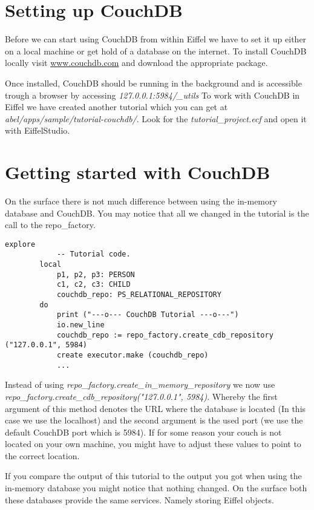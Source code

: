 \documentclass[a4paper,12pt]{report}
\begin{document}
\section{Setting up CouchDB}

Before we can start using CouchDB from within Eiffel we have to set it up either on a local machine or get hold of a database on the internet. To install CouchDB locally visit \url{www.couchdb.com} and download the appropriate package.

Once installed, CouchDB should be running in the background and is accessible trough a browser by accessing \emph{127.0.0.1:5984/\_utils}
To work with CouchDB in Eiffel we have created another tutorial which you can get at \emph{abel/apps/sample/tutorial-couchdb/}. Look for the \emph{tutorial\_project.ecf} and open it with EiffelStudio.

\section{Getting started with CouchDB}

On the surface there is not much difference between using the in-memory database and CouchDB. You may notice that all we changed in the tutorial is the call to the repo\_factory. 
\begin{lstlisting}[language=OOSC2Eiffel, captionpos=b, caption={The CouchDB Tutorial}, label={lst:explore_couchdb}]
	explore
			-- Tutorial code.
		local
			p1, p2, p3: PERSON
			c1, c2, c3: CHILD
			couchdb_repo: PS_RELATIONAL_REPOSITORY
		do
			print ("---o--- CouchDB Tutorial ---o---")
			io.new_line
			couchdb_repo := repo_factory.create_cdb_repository ("127.0.0.1", 5984)
			create executor.make (couchdb_repo)
			...
\end{lstlisting}
Instead of using \emph{repo\_factory.create\_in\_memory\_repository} we now use \newline
\emph{repo\_factory.create\_cdb\_repository("127.0.0.1", 5984)}.
Whereby the first argument of this method denotes the URL where the database is located (In this case we use the localhost) and the second argument is the used port (we use the default CouchDB port which is 5984). If for some reason your couch is not located on your own machine, you might have to adjust these values to point to the correct location.

If you compare the output of this tutorial to the output you got when using the in-memory database you might notice that nothing changed. On the surface both these databases provide the same services. Namely storing Eiffel objects.
\end{document}
